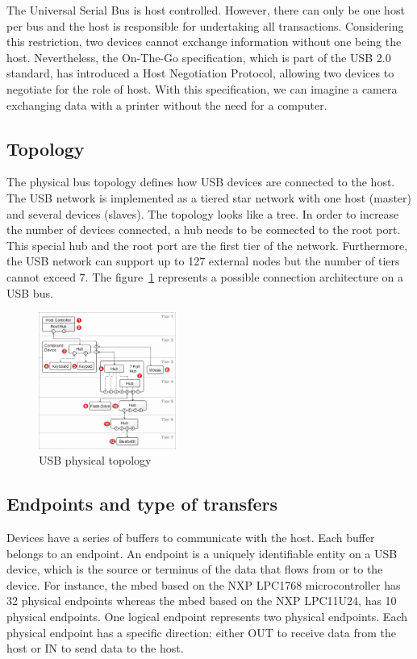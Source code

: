 \documentclass[pdftex,10pt,a4paper]{report}
\begin{document}
The Universal Serial Bus is host controlled. However, there can only be one host per bus and the host is responsible for undertaking all transactions. Considering this restriction, two devices cannot exchange information without one being the host. Nevertheless, the On-The-Go specification, which is part of the USB 2.0 standard, has introduced a Host Negotiation Protocol, allowing two devices to negotiate for the role of host. With this specification, we can imagine a camera exchanging data with a printer without the need for a computer. 

\subsection{Topology}
The physical bus topology defines how USB devices are connected to the host. The USB network is implemented as a tiered star network with one host (master) and several devices (slaves). The topology looks like a tree. In order to increase the number of devices connected, a hub needs to be connected to the root port. This special hub and the root port are the first tier of the network. Furthermore, the USB network can support up to 127 external nodes but the number of tiers cannot exceed 7. The figure~\ref{USB physical topology} represents a possible connection architecture on a USB bus.


\begin{figure}[h!]
		\centering
		\includegraphics[width=0.4\textwidth]{./usb_topology.jpg}
		\caption{USB physical topology \footnotemark}
		\label{USB physical topology}
\end{figure}
\subsection{Endpoints and type of transfers}
Devices have a series of buffers to communicate with the host. Each buffer belongs to an endpoint. An endpoint is a uniquely identifiable entity on a USB device, which is the source or terminus of the data that flows from or to the device. For instance, the mbed based on the NXP LPC1768 microcontroller has 32 physical endpoints whereas the mbed based on the NXP LPC11U24, has 10 physical endpoints. One logical endpoint represents two physical endpoints. Each physical endpoint has a specific direction: either OUT to receive data from the host or IN to send data to the host. 
\end{document}
